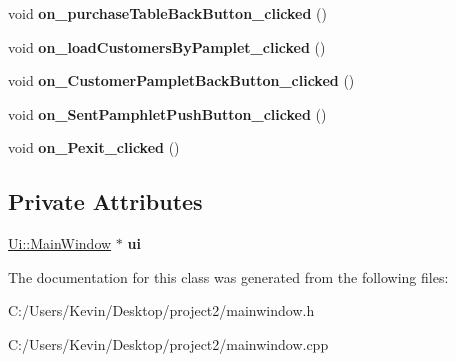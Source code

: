 \begin{DoxyCompactItemize}
\item 
\mbox{\label{class_main_window_adf901ae86c89c1e348dfe7fbe9609be8}} 
void {\bfseries on\+\_\+purchase\+Table\+Back\+Button\+\_\+clicked} ()
\item 
\mbox{\label{class_main_window_a98d4fd5204351c3fb00762c85419ebaa}} 
void {\bfseries on\+\_\+load\+Customers\+By\+Pamplet\+\_\+clicked} ()
\item 
\mbox{\label{class_main_window_af56a7b3e24e0ab4019e14bc7c0eeee1b}} 
void {\bfseries on\+\_\+\+Customer\+Pamplet\+Back\+Button\+\_\+clicked} ()
\item 
\mbox{\label{class_main_window_ae1bf0b03691b78ed6626e4baf393f9bc}} 
void {\bfseries on\+\_\+\+Sent\+Pamphlet\+Push\+Button\+\_\+clicked} ()
\item 
\mbox{\label{class_main_window_a4b6332f4585f28b5fce0e4738cecc435}} 
void {\bfseries on\+\_\+\+Pexit\+\_\+clicked} ()
\end{DoxyCompactItemize}
\subsection*{Private Attributes}
\begin{DoxyCompactItemize}
\item 
\mbox{\label{class_main_window_a35466a70ed47252a0191168126a352a5}} 
\mbox{\hyperlink{class_ui_1_1_main_window}{Ui\+::\+Main\+Window}} $\ast$ {\bfseries ui}
\end{DoxyCompactItemize}


The documentation for this class was generated from the following files\+:\begin{DoxyCompactItemize}
\item 
C\+:/\+Users/\+Kevin/\+Desktop/project2/mainwindow.\+h\item 
C\+:/\+Users/\+Kevin/\+Desktop/project2/mainwindow.\+cpp\end{DoxyCompactItemize}
